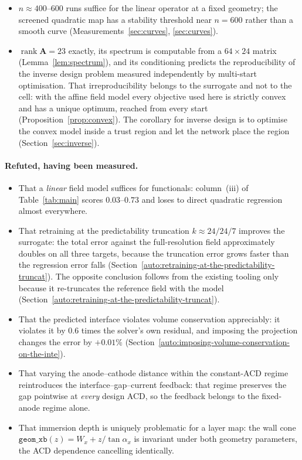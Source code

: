 \documentclass[11pt,a4paper]{article}
\newcommand{\vect}[1]{\mathbf{#1}}
\DeclareMathOperator{\rank}{rank}
\theoremstyle{plain}
\theoremstyle{definition}
\theoremstyle{remark}
\begin{document}
\begin{itemize}
it, so the result bounds what a campaign must \emph{cover} rather than which
model to use (Section~\ref{sec:boundary}).
\item $n \approx 400$--$600$ runs suffice for the linear operator at a fixed
geometry; the screened quadratic map has a stability threshold near $n=600$
rather than a smooth curve (Measurements~\ref{sec:curves},
\ref{sec:curves}).
\item $\rank\vect{A} = 23$ exactly, its spectrum is computable from a
$64\times24$ matrix (Lemma~\ref{lem:spectrum}), and its conditioning predicts
the reproducibility of the inverse design problem measured independently by
multi-start optimisation. That irreproducibility belongs to the surrogate and
not to the cell: with the affine field model every objective used here is
strictly convex and has a unique optimum, reached from every start
(Proposition~\ref{prop:convex}). The corollary for inverse design is to optimise
the convex model inside a trust region and let the network place the region
(Section~\ref{sec:inverse}).
\end{itemize}

\paragraph{Refuted, having been measured.}
\begin{itemize}\itemsep2pt
\item That a \emph{linear} field model suffices for functionals: column~(iii) of
Table~\ref{tab:main} scores $0.03$--$0.73$ and loses to direct quadratic
regression almost everywhere.
\item That retraining at the predictability truncation $k\approx24/24/7$
improves the surrogate: the total error against the full-resolution field
approximately doubles on all three targets, because the truncation error grows
faster than the regression error falls (Section~\ref{auto:retraining-at-the-predictability-truncat}). The
opposite conclusion follows from the existing tooling only because it
re-truncates the reference field with the model
(Section~\ref{auto:retraining-at-the-predictability-truncat}).
\item That the predicted interface violates volume conservation appreciably: it
violates it by $0.6$ times the solver's own residual, and imposing the
projection changes the error by $+0.01\%$ (Section~\ref{auto:imposing-volume-conservation-on-the-inte}).
\item That varying the anode--cathode distance within the constant-ACD regime
reintroduces the interface--gap--current feedback: that regime preserves the gap
pointwise at \emph{every} design ACD, so the feedback belongs to the
fixed-anode regime alone.
\item That immersion depth is uniquely problematic for a layer map: the wall cone
$\texttt{geom\_xb}(z) = W_x + z/\tan\alpha_x$ is invariant under both geometry
parameters, the ACD dependence cancelling identically.
\end{itemize}
\end{document}
